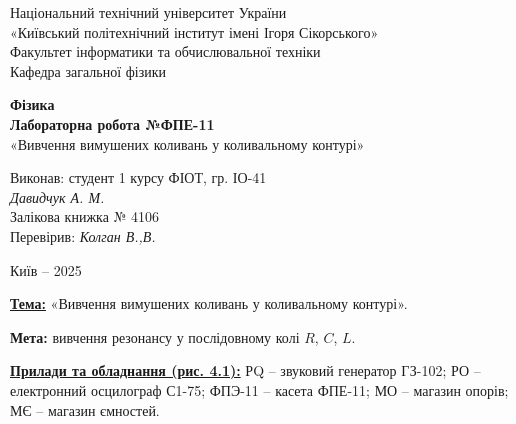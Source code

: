 \documentclass[12pt,a4paper]{article}
\begin{document}
    \begin{titlepage}

        \thispagestyle{empty}
        \begin{center}
        \large
            Національний технічний університет України\\
            «Київський політехнічний інститут імені Ігоря Сікорського»\\[1em]
            Факультет інформатики та обчислювальної техніки\\
            Кафедра загальної фізики
        \end{center}

        \vfill

        \begin{center}
        \textbf{\LARGE Фізика}\\[2em]
        \textbf{\Large Лабораторна робота №ФПЕ-11}\\
        «Вивчення вимушених коливань у коливальному контурі» 
        \end{center}

        \vfill

        \begin{flushright}
        Виконав: студент 1 курсу ФІОТ, гр. ІО-41\\
        \textit{Давидчук А. М.}\\
        Залікова книжка № 4106\\[1em]
        Перевірив: \textit{Колган В.,В.}
        \end{flushright}

        \vfill

        \begin{center}
        Київ -- 2025
        \end{center}

    \end{titlepage}

    \setlength{\parindent}{0pt}

    \textbf{\underline{Тема:}} «Вивчення вимушених коливань у коливальному контурі».

    \vspace{1em}

    \textbf{Мета:} вивчення резонансу у послідовному колі $R$, $C$, $L$.

    \vspace{1em}

    \textbf{\underline{Прилади та обладнання (рис. 4.1):}}
    РQ – звуковий генератор ГЗ-102; РО – електронний осцилограф С1-75;
    ФПЭ-11 – касета ФПЕ-11; МО – магазин опорів; МЄ – магазин ємностей.
\end{document}
